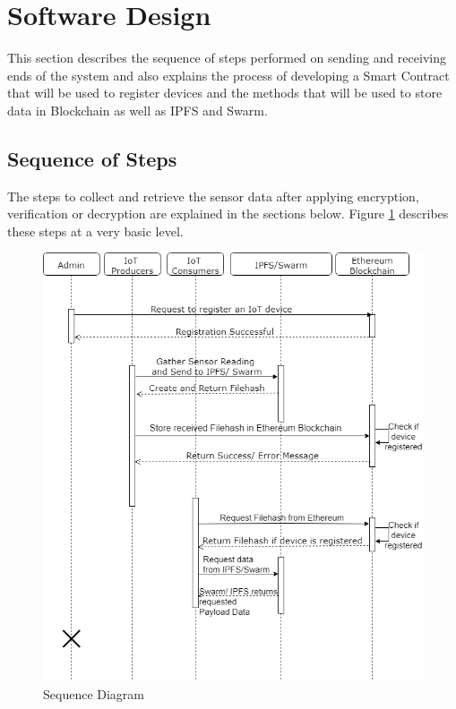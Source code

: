 \documentclass[11pt,openright]{report}
\begin{document}
\section{Software Design} \label{ss:software_design}
This section describes the sequence of steps performed on sending and receiving ends of the system and also explains the process of developing a Smart Contract that will be used to register devices and the methods that will be used to store data in Blockchain as well as IPFS and Swarm.

\subsection{Sequence of Steps}
The steps to collect and retrieve the sensor data after applying encryption, verification or decryption are explained in the sections below. Figure \ref{fig:dataflow_diagram} describes these steps at a very basic level.

\begin{figure}
    \centering
    \includegraphics[scale=0.5]{images/SequenceDiagram.png}
    \caption{Sequence Diagram}
    \label{fig:dataflow_diagram}
\end{figure}
\end{document}

